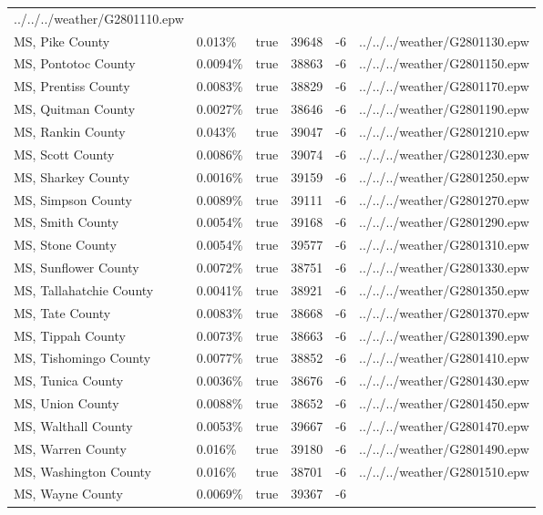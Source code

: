 \begin{longtable}[]{@{}llllll@{}}
../../../weather/G2801110.epw \\
MS, Pike County & 0.013\% & true & 39648 & -6 &
../../../weather/G2801130.epw \\
MS, Pontotoc County & 0.0094\% & true & 38863 & -6 &
../../../weather/G2801150.epw \\
MS, Prentiss County & 0.0083\% & true & 38829 & -6 &
../../../weather/G2801170.epw \\
MS, Quitman County & 0.0027\% & true & 38646 & -6 &
../../../weather/G2801190.epw \\
MS, Rankin County & 0.043\% & true & 39047 & -6 &
../../../weather/G2801210.epw \\
MS, Scott County & 0.0086\% & true & 39074 & -6 &
../../../weather/G2801230.epw \\
MS, Sharkey County & 0.0016\% & true & 39159 & -6 &
../../../weather/G2801250.epw \\
MS, Simpson County & 0.0089\% & true & 39111 & -6 &
../../../weather/G2801270.epw \\
MS, Smith County & 0.0054\% & true & 39168 & -6 &
../../../weather/G2801290.epw \\
MS, Stone County & 0.0054\% & true & 39577 & -6 &
../../../weather/G2801310.epw \\
MS, Sunflower County & 0.0072\% & true & 38751 & -6 &
../../../weather/G2801330.epw \\
MS, Tallahatchie County & 0.0041\% & true & 38921 & -6 &
../../../weather/G2801350.epw \\
MS, Tate County & 0.0083\% & true & 38668 & -6 &
../../../weather/G2801370.epw \\
MS, Tippah County & 0.0073\% & true & 38663 & -6 &
../../../weather/G2801390.epw \\
MS, Tishomingo County & 0.0077\% & true & 38852 & -6 &
../../../weather/G2801410.epw \\
MS, Tunica County & 0.0036\% & true & 38676 & -6 &
../../../weather/G2801430.epw \\
MS, Union County & 0.0088\% & true & 38652 & -6 &
../../../weather/G2801450.epw \\
MS, Walthall County & 0.0053\% & true & 39667 & -6 &
../../../weather/G2801470.epw \\
MS, Warren County & 0.016\% & true & 39180 & -6 &
../../../weather/G2801490.epw \\
MS, Washington County & 0.016\% & true & 38701 & -6 &
../../../weather/G2801510.epw \\
MS, Wayne County & 0.0069\% & true & 39367 & -6 &

\end{longtable}
